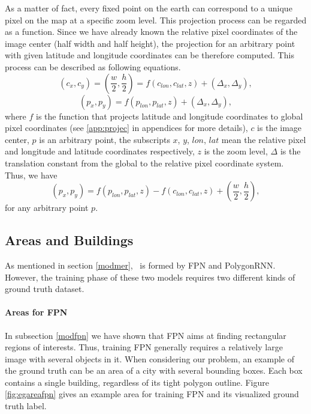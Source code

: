 As a matter of fact, every fixed point on the earth can correspond to a unique pixel on the map at a specific zoom level. This projection process can be regarded as a function. Since we have already known the relative pixel coordinates of the image center (half width and half height), the projection for an arbitrary point with given latitude and longitude coordinates can be therefore computed. This process can be described as following equations.
\begin{equation}
	(c_x, c_y) = (\frac{w}{2}, \frac{h}{2}) = f(c_{lon}, c_{lat}, z) + (\Delta_x, \Delta_y),
\end{equation}
\begin{equation}
	(p_x, p_y) = f(p_{lon}, p_{lat}, z) + (\Delta_x, \Delta_y),
\end{equation}
where $f$ is the function that projects latitude and longitude coordinates to global pixel coordinates (see \ref{app:projec} in appendices for more details), $c$ is the image center, $p$ is an arbitrary point, the subscripts $x$, $y$, $lon$, $lat$ mean the relative pixel and longitude and latitude coordinates respectively, $z$ is the zoom level, $\Delta$ is the translation constant from the global to the relative pixel coordinate system. Thus, we have
\begin{equation}
	(p_x, p_y) = f(p_{lon}, p_{lat}, z) - f(c_{lon}, c_{lat}, z) + (\frac{w}{2}, \frac{h}{2}),
\end{equation}
for any arbitrary point $p$.

\subsection{Areas and Buildings}\label{arebui}

As mentioned in section \ref{modmer}, \modelnameshort\ is formed by FPN and PolygonRNN. However, the training phase of these two models requires two different kinds of ground truth dataset.

\paragraph{Areas for FPN}
In subsection \ref{modfpn} we have shown that FPN aims at finding rectangular regions of interests. Thus, training FPN generally requires a relatively large image with several objects in it. When considering our problem, an example of the ground truth can be an area of a city with several bounding boxes. Each box contains a single building, regardless of its tight polygon outline. Figure \ref{fig:egareafpn} gives an example area for training FPN and its visualized ground truth label.

